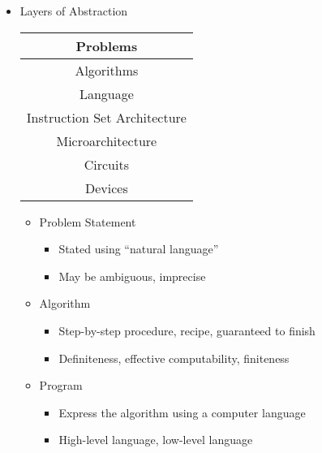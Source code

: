 \begin{itemize}
  \item Layers of Abstraction

    \begin{center}
      \begin{tabular}[h]{|c|}
        \hline
        Problems\\
        \hline
        Algorithms\\
        \hline
        Language\\
        \hline
        Instruction Set Architecture\\
        \hline
        Microarchitecture\\
        \hline
        Circuits\\
        \hline
        Devices\\
        \hline
      \end{tabular}
    \end{center}

    \begin{itemize}

      \item Problem Statement

        \begin{itemize}

          \item Stated using ``natural language''

          \item May be ambiguous, imprecise

        \end{itemize}

      \item Algorithm

        \begin{itemize}

          \item Step-by-step procedure, recipe, guaranteed to finish

          \item Definiteness, effective computability, finiteness

        \end{itemize}

      \item Program

        \begin{itemize}

          \item Express the algorithm using a computer language

          \item High-level language, low-level language


\end{itemize}
\end{itemize}
\end{itemize}
